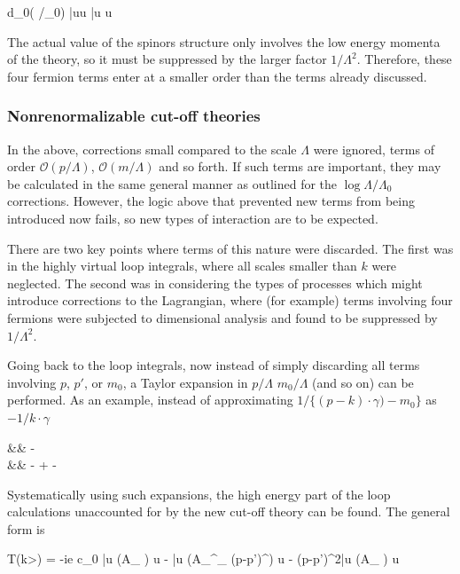 \beq
d_0( \Lambda/\Lambda_0)   \bar{u}u \bar{u} u
\eeq

The actual value of the spinors structure only involves the low energy momenta of the theory, so it must be suppressed by the larger factor $1/\Lambda^2$.  Therefore, these four fermion terms enter at a smaller order than the terms already discussed.


\subsubsection{Nonrenormalizable cut-off theories}
In the above, corrections small compared to the scale $\Lambda$ were ignored, terms of order $\mathcal{O}( p/\Lambda)$, $\mathcal{O}( m/\Lambda)$ and so forth.  If such terms are important, they may be calculated in the same general manner as outlined for the $\log \Lambda/\Lambda_0$ corrections.  However, the logic above that prevented new terms from being introduced now fails, so new types of interaction are to be expected.

There are two key points where terms of this nature were discarded.  The first was in the highly virtual loop integrals, where all scales smaller than $k$ were neglected.  The second was in considering the types of processes which might introduce corrections to the Lagrangian, where (for example) terms involving four fermions were subjected to dimensional analysis and found to be suppressed by $1/\Lambda^2$.

Going back to the loop integrals, now instead of simply discarding all terms involving $p$, $p'$, or $m_0$, a Taylor expansion in $p/\Lambda$ $m_0/\Lambda$ (and so on) can be performed.  As an example, instead of approximating $ 1 / \{ (p-k) \cdot \gamma ) - m _0 \}$ as $-1/k\cdot \gamma$

\beqa
		&\approx& - 	\\
		&\approx& -  +  - 
\eeqa

Systematically using such expansions, the high energy part of the loop calculations unaccounted for by the new cut-off theory can be found.  The general form is

\beq
	T(k>\Lambda) = -ie c_0 \bar{u} (A_{} \cdot \gamma ) u
					-  \bar{u} (A_{}^\mu \sigma_{\mu\nu} (p-p')^\nu) u
					- (p-p')^2\bar{u} (A_{} \cdot \gamma) u
\eeq

